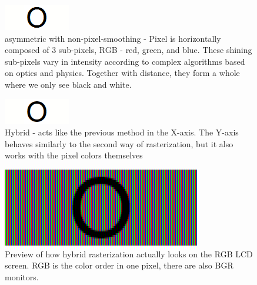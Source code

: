 \documentclass[a4paper]{article}
\begin{document}
\begin{figure} [H]
  \includegraphics [width =\linewidth]{pics/o_TT.png}
  \caption{asymmetric with non-pixel-smoothing - Pixel is horizontally composed of 3 sub-pixels, RGB - red, green, and blue. These shining sub-pixels vary in intensity according to complex algorithms based on optics and physics. Together with distance, they form a whole where we only see black and white. }
\end{figure}

\begin{figure} [H]
  \includegraphics [width =\linewidth]{pics/o_TT_antialiasing.png}
  \caption{Hybrid - acts like the previous method in the X-axis. The Y-axis behaves similarly to the second way of rasterization, but it also works with the pixel colors themselves}
\end{figure}

\begin{figure} [H]
  \includegraphics [width =\linewidth]{pics/o_TT_antialiasing_preview.png}
  \caption{Preview of how hybrid rasterization actually looks on the RGB LCD screen. RGB is the color order in one pixel, there are also BGR monitors.}
\end{figure}
\end{document}
